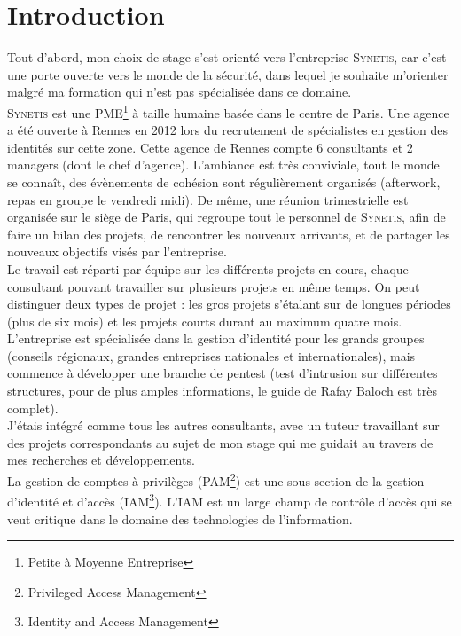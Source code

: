 \section*{Introduction} \label{intro}%

%
%
%
Tout d'abord, mon choix de stage s'est orienté vers l'entreprise \textsc{Synetis}, car c'est une porte ouverte vers le monde de la sécurité, dans lequel je souhaite m'orienter malgré ma formation qui n'est pas spécialisée dans ce domaine.\\
\textsc{Synetis} est une PME\footnote{Petite à Moyenne Entreprise} à taille humaine basée dans le centre de Paris. Une agence a été ouverte à Rennes en 2012 lors du recrutement de spécialistes en gestion des identités sur cette zone. Cette agence de Rennes compte 6 consultants et 2 managers (dont le chef d'agence). L'ambiance est très conviviale, tout le monde se connaît, des évènements de cohésion sont régulièrement organisés (afterwork, repas en groupe le vendredi midi). De même, une réunion trimestrielle est organisée sur le siège de Paris, qui regroupe tout le personnel de \textsc{Synetis}, afin de faire un bilan des projets, de rencontrer les nouveaux arrivants, et de partager les nouveaux objectifs visés par l'entreprise.\\
Le travail est réparti par équipe sur les différents projets en cours, chaque consultant pouvant travailler sur plusieurs projets en même temps. On peut distinguer deux types de projet : les gros projets s'étalant sur de longues périodes (plus de six mois) et les projets courts durant au maximum quatre mois. L'entreprise est spécialisée dans la gestion d'identité pour les grands groupes (conseils régionaux, grandes entreprises nationales et internationales), mais commence à développer une branche de pentest (test d'intrusion sur différentes structures, pour de plus amples informations, le guide de Rafay Baloch \cite{rba} est très complet).\\
J'étais intégré comme tous les autres consultants, avec un tuteur travaillant sur des projets correspondants au sujet de mon stage qui me guidait au travers de mes recherches et développements.\\
La gestion de comptes à privilèges (PAM\footnote{Privileged Access Management}) est une sous-section de la gestion d’identité et d’accès (IAM\footnote{Identity and Access Management}). L’IAM est un large champ de contrôle d’accès qui se veut critique dans le domaine des technologies de l’information.\\
